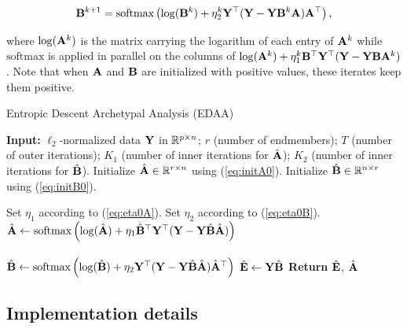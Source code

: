 \begin{equation} \label{eq:update_B}
  \mathbf B^{k+1} = \text{softmax}\left( \log(\mathbf B^k) + \eta_2^k \mathbf Y^\top (\mathbf Y - \mathbf Y \mathbf B^k \mathbf A) \mathbf A^\top \right),
\end{equation}

where $\log(\mathbf A^k)$ is the matrix carrying the logarithm of each entry of $\mathbf A^k$
while $\text{softmax}$ is applied in parallel on the columns of $\log(\mathbf A^k) +
\eta_1^k \mathbf B^\top \mathbf Y^\top (\mathbf Y - \mathbf Y \mathbf B \mathbf A^k)$. Note that when $\mathbf A$ and $\mathbf B$ are
initialized with positive values, these iterates keep them positive.


\begin{algorithm}[h]
  \caption{Entropic Descent Archetypal Analysis (EDAA)}\label{alg:EDAA}
  \begin{algorithmic}[1]
    \State \textbf{Input:} $\ell_2$-normalized data $\mathbf Y$ in $\mathbb R^{p \times n}$; $r$ (number of
    endmembers); $T$ (number of outer iterations); $K_1$ (number of inner
    iterations for $\hat{\mathbf A}$); $K_2$ (number of inner iterations for $\hat{\mathbf B}$).
    \State Initialize $\hat{\mathbf A}  \in \mathbb R^{r \times n}$ using (\ref{eq:initA0}).
    \State Initialize $\hat{\mathbf B} \in \mathbb R^{n \times r}$ using (\ref{eq:initB0}).

    \State Set $\eta_1$ according to (\ref{eq:eta0A}).
    \State Set $\eta_2$ according to (\ref{eq:eta0B}).
      \State $\hat{\mathbf A} \gets \text{softmax}\left( \log(\hat{\mathbf A}) + \eta_1
        \hat{\mathbf B}^\top \mathbf Y^\top (\mathbf Y - \mathbf Y \hat{\mathbf B} \hat{\mathbf A}) \right)$\\
      \\
      \EndFor
      \State $\hat{\mathbf B} \gets \text{softmax} \left( \log(\hat{\mathbf B}) + \eta_2
        \mathbf Y^\top (\mathbf Y - \mathbf Y \hat{\mathbf B} \hat{\mathbf A}) \hat{\mathbf A}^\top \right)$
      \EndFor
    \EndFor
    \State $\hat{\mathbf E} \gets \mathbf Y \hat{\mathbf B}$
    \State \textbf{Return} $\hat{\mathbf E}$, $\hat{\mathbf A}$ 
  \end{algorithmic}
\end{algorithm}

\subsection{Implementation details}
\label{subsec:details}

